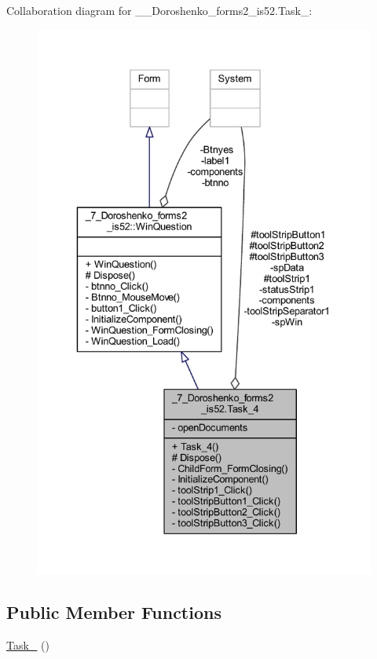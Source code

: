 Collaboration diagram for \+\_\+\_\+\+Doroshenko\+\_\+forms2\+\_\+is52.\+Task\+\_\+:
\nopagebreak
\begin{figure}[H]
\begin{center}
\leavevmode
\includegraphics[width=335pt]{class__7___doroshenko__forms2__is52_1_1_task__4__coll__graph}
\end{center}
\end{figure}
\subsection*{Public Member Functions}
\begin{DoxyCompactItemize}
\item 
\hyperlink{class__7___doroshenko__forms2__is52_1_1_task__4_ab407149ae7de6eea3e2107c0c264b49d}{Task\+\_} ()
\end{DoxyCompactItemize}
